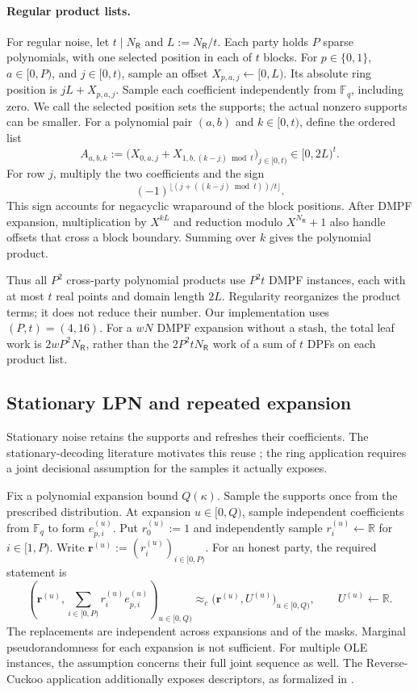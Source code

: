 \paragraph{Regular product lists.}
For regular noise, let $t\mid N_{\mathsf R}$ and
$L:=N_{\mathsf R}/t$.
Each party holds $P$ sparse polynomials, with one selected position
in each of $t$ blocks. For $p\in\{0,1\}$, $a\in[0,P)$, and $j\in[0,t)$,
sample an offset $X_{p,a,j}\gets[0,L)$.
Its absolute ring position is $jL+X_{p,a,j}$.
Sample each coefficient independently from $\mathbb F_q$, including zero.
We call the selected position sets the supports; the actual nonzero
supports can be smaller.
For a polynomial pair $(a,b)$ and $k\in[0,t)$, define the ordered list
\begin{equation}\label{eq:ringlpn-product-list}
 A_{a,b,k}:=
 \bigl(X_{0,a,j}+X_{1,b,(k-j)\bmod t}\bigr)_{j\in[0,t)}
 \in[0,2L)^t.
\end{equation}
For row $j$, multiply the two coefficients and the sign
\[
 (-1)^{\lfloor(j+((k-j)\bmod t))/t\rfloor}.
\]
This sign accounts for negacyclic wraparound of the block positions.
After DMPF expansion, multiplication by $X^{kL}$ and reduction modulo
$X^{N_{\mathsf R}}+1$ also handle offsets that cross a block boundary.
Summing over $k$ gives the polynomial product.

Thus all $P^2$ cross-party polynomial products use $P^2t$ DMPF instances,
each with at most $t$ real points and domain length $2L$.
Regularity reorganizes the product terms; it does not reduce their number.
Our implementation uses $(P,t)=(4,16)$.
For a $wN$ DMPF expansion without a stash, the total leaf work is
$2wP^2N_{\mathsf R}$, rather than the
$2P^2tN_{\mathsf R}$ work of a sum of $t$ DPFs on each product list.

\subsection{Stationary LPN and repeated expansion}\label{sec:stationary}

Stationary noise retains the supports and refreshes their coefficients.
The stationary-decoding literature motivates this reuse \cite{Stationary};
the ring application requires a joint decisional assumption for the samples
it actually exposes.

Fix a polynomial expansion bound $Q(\kappa)$.
Sample the supports once from the prescribed distribution.
At expansion $u\in[0,Q)$, sample independent coefficients from $\mathbb F_q$ to form
$e^{(u)}_{p,i}$. Put $r_0^{(u)}:=1$ and independently sample
$r_i^{(u)}\gets\mathbb R$ for $i\in[1,P)$.
Write $\mathbf r^{(u)}:=(r_i^{(u)})_{i\in[0,P)}$.
For an honest party, the required statement is
\[
 \left(\mathbf r^{(u)},\sum_{i\in[0,P)}r_i^{(u)}e^{(u)}_{p,i}\right)_{u\in[0,Q)}
 \approx_c
 \bigl(\mathbf r^{(u)},U^{(u)}\bigr)_{u\in[0,Q)},
 \qquad U^{(u)}\gets\mathbb R.
\]
The replacements are independent across expansions and of the masks.
Marginal pseudorandomness for each expansion is not sufficient.
For multiple OLE instances, the assumption concerns their full joint
sequence as well. The Reverse-Cuckoo application additionally exposes
descriptors, as formalized in .

